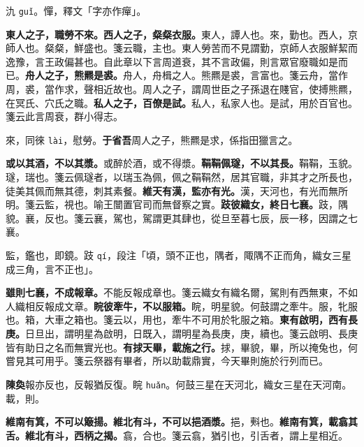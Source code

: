 \begin{quoting}氿 \texttt{guǐ}。憚，釋文「字亦作癉」。\end{quoting}

\textbf{東人之子，職勞不來。西人之子，粲粲衣服。}{\footnotesize 東人，譚人也。來，勤也。西人，京師人也。粲粲，鮮盛也。箋云職，主也。東人勞苦而不見謂勤，京師人衣服鮮絜而逸豫，言王政偏甚也。自此章以下言周道衰，其不言政偏，則言眾官廢職如是而已。}\textbf{舟人之子，熊羆是裘。}{\footnotesize 舟人，舟楫之人。熊羆是裘，言富也。箋云舟，當作周，裘，當作求，聲相近故也。周人之子，謂周世臣之子孫退在賤官，使搏熊羆，在冥氏、穴氏之職。}\textbf{私人之子，百僚是試。}{\footnotesize 私人，私家人也。是試，用於百官也。箋云此言周衰，群小得志。}

\begin{quoting}來，同徠 \texttt{lài}，慰勞。\textbf{于省吾}周人之子，熊羆是求，係指田獵言之。\end{quoting}

\textbf{或以其酒，不以其漿。}{\footnotesize 或醉於酒，或不得漿。}\textbf{鞙鞙佩璲，不以其長。}{\footnotesize 鞙鞙，玉貌。璲，瑞也。箋云佩璲者，以瑞玉為佩，佩之鞙鞙然，居其官職，非其才之所長也，徒美其佩而無其德，刺其素餐。}\textbf{維天有漢，監亦有光。}{\footnotesize 漢，天河也，有光而無所明。箋云監，視也。喻王闓置官司而無督察之實。}\textbf{跂彼織女，終日七襄。}{\footnotesize 跂，隅貌。襄，反也。箋云襄，駕也，駕謂更其肆也，從旦至暮七辰，辰一移，因謂之七襄。}

\begin{quoting}監，鑑也，即鏡。跂 \texttt{qí}，段注「頃，頭不正也，隅者，陬隅不正而角，織女三星成三角，言不正也」。\end{quoting}

\textbf{雖則七襄，不成報章。}{\footnotesize 不能反報成章也。箋云織女有織名爾，駕則有西無東，不如人織相反報成文章。}\textbf{睆彼牽牛，不以服箱。}{\footnotesize 睆，明星貌。何鼓謂之牽牛。服，牝服也。箱，大車之箱也。箋云以，用也，牽牛不可用於牝服之箱。}\textbf{東有啟明，西有長庚。}{\footnotesize 日旦出，謂明星為啟明，日既入，謂明星為長庚，庚，續也。箋云啟明、長庚皆有助日之名而無實光也。}\textbf{有捄天畢，載施之行。}{\footnotesize 捄，畢貌，畢，所以掩兔也，何嘗見其可用乎。箋云祭器有畢者，所以助載鼎實，今天畢則施於行列而已。}

\begin{quoting}\textbf{陳奐}報亦反也，反報猶反復。睆 \texttt{huǎn}。何鼓三星在天河北，織女三星在天河南。載，則。\end{quoting}

\textbf{維南有箕，不可以簸揚。維北有斗，不可以挹酒漿。}{\footnotesize 挹，㪺也。}\textbf{維南有箕，載翕其舌。維北有斗，西柄之揭。}{\footnotesize 翕，合也。箋云翕，猶引也，引舌者，謂上星相近。}

